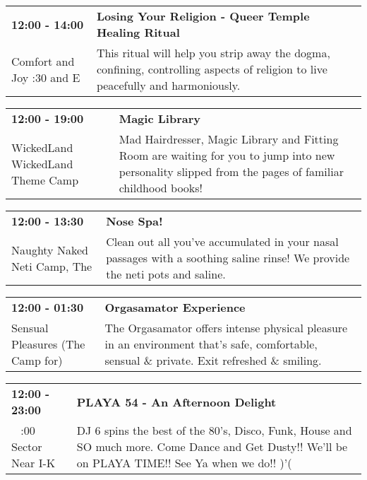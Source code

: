 \begin{tabular}{ p{1in} p{2.2in} }
    \textbf{12:00 - 14:00} & \textbf{Losing Your Religion - Queer Temple Healing Ritual} \\
    Comfort and Joy \newline 7:30 and E & This ritual will help you strip away the dogma, confining, controlling aspects of religion to live peacefully and harmoniously. \\
    \hline 
\end{tabular}
    
\begin{tabular}{ p{1in} p{2.2in} }
    \textbf{12:00 - 19:00} & \textbf{Magic Library} \\
    WickedLand \newline WickedLand Theme Camp & Mad Hairdresser, Magic Library and Fitting Room are waiting for you to jump into new personality slipped from the pages of familiar childhood books! \\
    \hline 
\end{tabular}
    
\begin{tabular}{ p{1in} p{2.2in} }
    \textbf{12:00 - 13:30} & \textbf{Nose Spa! } \\
    Naughty Naked Neti Camp, The \newline  & Clean out all you've accumulated in your nasal passages with a soothing saline rinse! We provide the neti pots and saline. \\
    \hline 
\end{tabular}
    
\begin{tabular}{ p{1in} p{2.2in} }
    \textbf{12:00 - 01:30} & \textbf{Orgasamator Experience} \\
    Sensual Pleasures (The Camp for) \newline  & The Orgasamator offers intense physical pleasure in an environment that's safe, comfortable, sensual \& private.  Exit refreshed \& smiling. \\
    \hline 
\end{tabular}
    
\begin{tabular}{ p{1in} p{2.2in} }
    \textbf{12:00 - 23:00} & \textbf{PLAYA 54 - An Afternoon Delight} \\
    ~ \newline 9:00 Sector Near I-K & DJ 6 spins the best of the 80's, Disco, Funk, House and SO much more. Come Dance and Get Dusty!! We'll be on PLAYA TIME!! See Ya when we do!! )'( \\
    \hline 
\end{tabular}
    
